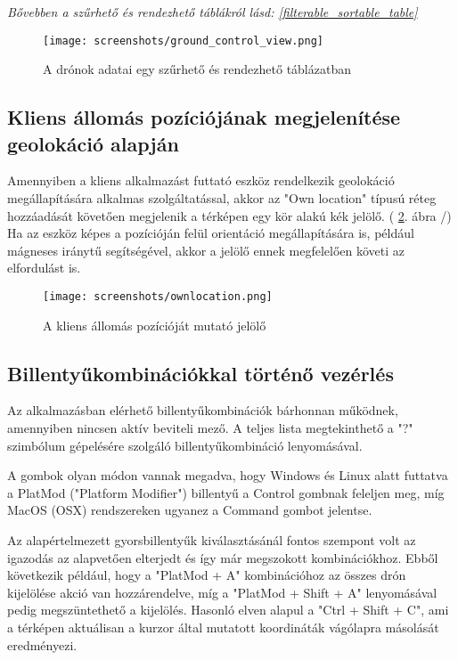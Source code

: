 \textit{
  Bővebben a szűrhető és rendezhető táblákról lásd:
  \ref{filterable_sortable_table}
}

\begin{figure}[H]
  \texttt{[image: screenshots/ground\_control\_view.png]}
  \caption{A drónok adatai egy szűrhető és rendezhető táblázatban}
  \label{fig:ground_control_view}
\end{figure}

\subsection{Kliens állomás pozíciójának megjelenítése geolokáció alapján}

Amennyiben a kliens alkalmazást futtató eszköz rendelkezik geolokáció
megállapítására alkalmas szolgáltatással, akkor az "Own location" típusú réteg
hozzáadását követően megjelenik a térképen egy kör alakú kék jelölő.
( \ref{fig:ownlocation}. ábra /) Ha az eszköz képes a pozícióján felül
orientáció megállapítására is, például mágneses iránytű segítségével, akkor a
jelölő ennek megfelelően követi az elfordulást is.

\begin{figure}[H]
  \texttt{[image: screenshots/ownlocation.png]}
  \caption{A kliens állomás pozícióját mutató jelölő}
  \label{fig:ownlocation}
\end{figure}

\newpage

\subsection{Billentyűkombinációkkal történő vezérlés}

Az alkalmazásban elérhető billentyűkombinációk bárhonnan működnek, amennyiben
nincsen aktív beviteli mező. A teljes lista megtekinthető a "?" szimbólum
gépelésére szolgáló billentyűkombináció lenyomásával.

A gombok olyan módon vannak megadva, hogy Windows és Linux alatt futtatva a
PlatMod ("Platform Modifier") billentyű a Control gombnak feleljen meg, míg
MacOS (OSX) rendszereken ugyanez a Command gombot jelentse.

Az alapértelmezett gyorsbillentyűk kiválasztásánál fontos szempont volt az
igazodás az alapvetően elterjedt és így már megszokott kombinációkhoz. Ebből
következik például, hogy a "PlatMod + A" kombinációhoz az összes drón
kijelölése akció van hozzárendelve, míg a "PlatMod + Shift + A" lenyomásával
pedig megszüntethető a kijelölés. Hasonló elven alapul a "Ctrl + Shift + C", ami
a térképen aktuálisan a kurzor által mutatott koordináták vágólapra másolását
eredményezi.

